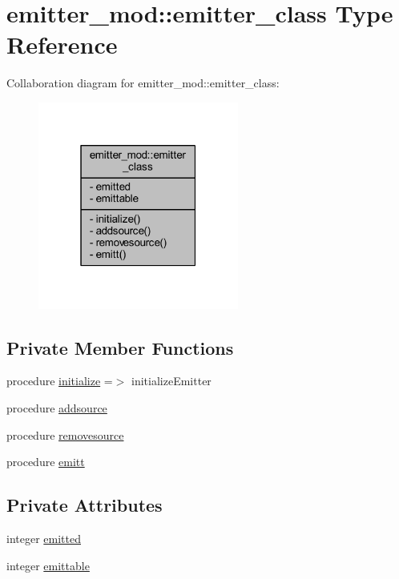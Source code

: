 \hypertarget{structemitter__mod_1_1emitter__class}{}\section{emitter\+\_\+mod\+:\+:emitter\+\_\+class Type Reference}
\label{structemitter__mod_1_1emitter__class}


Collaboration diagram for emitter\+\_\+mod\+:\+:emitter\+\_\+class\+:\nopagebreak
\begin{figure}[H]
\begin{center}
\leavevmode
\includegraphics[width=187pt]{structemitter__mod_1_1emitter__class__coll__graph}
\end{center}
\end{figure}
\subsection*{Private Member Functions}
\begin{DoxyCompactItemize}
\item 
procedure \mbox{\hyperlink{structemitter__mod_1_1emitter__class_acd215b2680677e298267c5940f0cf79b}{initialize}} =$>$ initialize\+Emitter
\item 
procedure \mbox{\hyperlink{structemitter__mod_1_1emitter__class_a162685b7b0bf96b555fee37e129c9783}{addsource}}
\item 
procedure \mbox{\hyperlink{structemitter__mod_1_1emitter__class_a277317a5cca4d7679d0e77edd350ef79}{removesource}}
\item 
procedure \mbox{\hyperlink{structemitter__mod_1_1emitter__class_ac33721448c01508a8e8c486cd7a76b65}{emitt}}
\end{DoxyCompactItemize}
\subsection*{Private Attributes}
\begin{DoxyCompactItemize}
\item 
integer \mbox{\hyperlink{structemitter__mod_1_1emitter__class_aa8f56d34f32e452a2e78f93f44780b4b}{emitted}}
\item 
integer \mbox{\hyperlink{structemitter__mod_1_1emitter__class_a201a8b070193b7217c5a5c8973d76cd6}{emittable}}
\end{DoxyCompactItemize}


